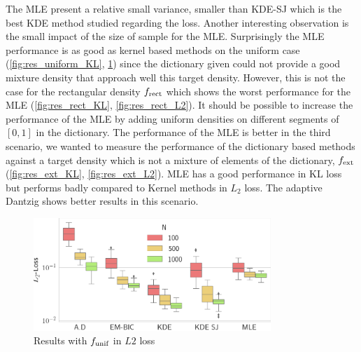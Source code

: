 The MLE present a relative small variance, smaller than KDE-SJ which is the best KDE method studied regarding the loss. Another interesting observation is the small impact of the size of sample for the MLE. Surprisingly the MLE performance is as good as kernel based methods on the uniform case (\cref{fig:res_uniform_KL}, \cref{fig:res_uniform_L2}) since the dictionary given could not provide a good mixture density that approach well this target density. However, this is not the case for the rectangular density $f_{\textnormal{rect}}$ which shows the worst performance for the MLE (\cref{fig:res_rect_KL}, \cref{fig:res_rect_L2}). It should be possible to increase the performance of the MLE by adding uniform densities on different segments of $[0,1]$ in the dictionary. The performance of the MLE is better in the third scenario, we wanted to measure the performance of the dictionary based methods against a target density which is not a mixture of elements of the dictionary, $f_{\textnormal{ext}}$ (\cref{fig:res_ext_KL}, \cref{fig:res_ext_L2}). MLE has a good performance in KL loss but performs badly compared to Kernel methods in $L_2$ loss. The adaptive Dantzig shows better results in this scenario.
\begin{figure}
    \includegraphics[width=0.8\textwidth]{./TeX_files/res_uniform_L2.png}
    \caption{Results with $f_{\textnormal{unif}}$ in $L2$ loss}
    \label{fig:res_uniform_L2}
\end{figure}

